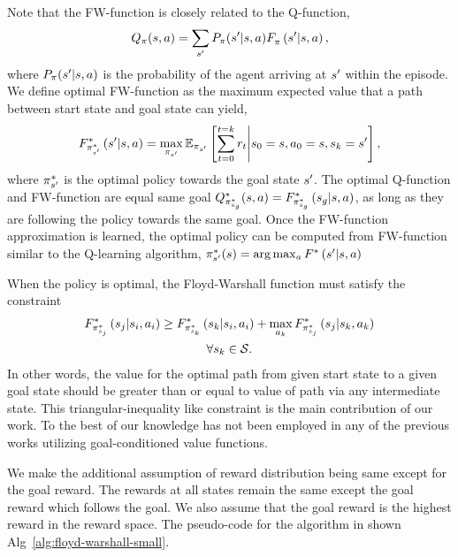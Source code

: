 Note that the FW-function is closely related to the Q-function,
\begin{align}
  \Q_\policy(\state, \act) = \sum_{\state'} P_\policy(\state' | \state, \act) \fwargs{\state}{\act}{\state'}{\policy}{},
\end{align}%
%
where $P_\policy(\state' | \state, \act)$ is the probability of the agent
arriving at $\state'$ within the episode. We define optimal FW-function as
the maximum expected value that a path between start state and goal state can
yield,
\begin{align}
\fwargs{\state}{\act}{\state'}{\policy^*_{\state'}}{*} =
\max_{\policy_{\state'}}\E_{\policy_{\state'}}\left[ \sum_{t=0}^{t=k} \rew_t \middle\vert \state_0 = \state, \act_0 = \state, \state_k = \state' \right] ,
\end{align}%
where $\policy^*_{\state'}$ is the
optimal policy towards the goal state $\state'$. The optimal Q-function and
FW-function are equal same goal
$\Q^*_{\policy^*_{\state_g}}(\state, \act) =
  \fwargs{\state}{\act}{\state_g}{\policy^*_{\state_g}}{*}$,
as long as they are following the policy towards the same goal. Once the
FW-function approximation is learned, the optimal policy can be computed from
FW-function similar to the Q-learning algorithm, $\policy^*_{\state'}(\state) =
\arg \max_{\act} \fwargs{\state}{\act}{\state'}{}{*}$

When the policy is optimal, the Floyd-Warshall function must satisfy the
constraint
%
\begin{multline}
\fwargs{\state_i}{\act_i}{\state_j}{\policy^*_{\state_j}}{*}
 \ge 
  \fwargs{\state_i}{\act_i}{\state_k}{\policy^*_{\state_k}}{*}
  + \max_{\act_k}\fwargs{\state_k}{\act_k}{\state_j}{\policy^*_{\state_j}}{*}
  \\
  \forall \state_k \in \State.
\end{multline}%
%
In other words, the value for the optimal path from given start state to a given
goal state should be greater than or equal to value of path via any intermediate
state.
This triangular-inequality like constraint is the main contribution of our work.
To the best of our knowledge has not been employed in any of the previous works
utilizing goal-conditioned value functions.

We make the additional assumption of reward distribution being same except for
the goal reward. The rewards at all states remain the same except the goal
reward which follows the goal. We also assume that the goal reward is the
highest reward in the reward space.
The pseudo-code for the algorithm in shown Alg~\ref{alg:floyd-warshall-small}.




